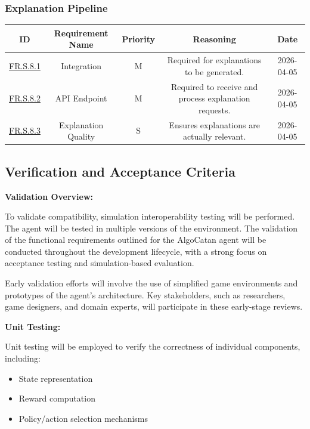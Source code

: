 \documentclass{article}
\begin{document}
\vspace{1em}

\subsubsection*{Explanation Pipeline}

\begin{tabular}{|c|c|c|c|c|}
\hline
\textbf{ID} & \textbf{Requirement Name} & \textbf{Priority} &
\textbf{Reasoning} & \textbf{Date} \\
\hline
\hyperref[FR.S.8.1]{FR.S.8.1} & \LLM{} Integration & M &
\parbox[t]{4cm}{Required for explanations to be generated.} &
2026-04-05 \\
\hline
\hyperref[FR.S.8.2]{FR.S.8.2} & API Endpoint & M &
\parbox[t]{4cm}{Required to receive and process explanation requests.} &
2026-04-05 \\
\hline
\hyperref[FR.S.8.3]{FR.S.8.3} & Explanation Quality & S &
\parbox[t]{4cm}{Ensures explanations are actually relevant.} &
2026-04-05 \\
\hline
\end{tabular}

\vspace{1em}
\subsection{Verification and Acceptance Criteria}\label{subsec:verification-and-acceptance-criteria}

\noindent\textbf{Validation Overview:}

To validate compatibility, simulation interoperability testing will be performed.
The \RL{} agent will be tested in multiple versions of the environment.
The validation of the functional requirements outlined for the AlgoCatan agent will be conducted throughout
the development lifecycle, with a strong focus on acceptance testing and simulation-based evaluation.

Early validation efforts will involve the use of simplified \emph{\Catan{}} game environments and prototypes
of the \RL{} agent's architecture.
Key stakeholders, such as \AI{} researchers, game designers, and domain experts,
will participate in these early-stage reviews.

\vspace{1em}

\noindent\textbf{Unit Testing:}

Unit testing will be employed to verify the correctness of individual components, including:
\begin{itemize}
    \item State representation
    \item Reward computation
    \item Policy/action selection mechanisms
\end{itemize}
\end{document}
